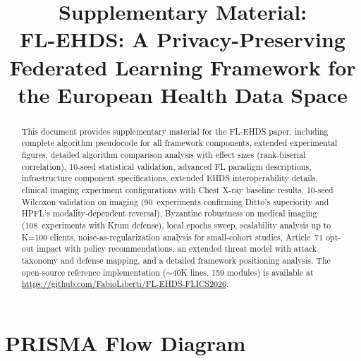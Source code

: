 \documentclass[conference,a4paper]{IEEEtran}
\begin{document}
\renewcommand{\thetable}{S-\Roman{table}}
\renewcommand{\thefigure}{S-\arabic{figure}}

\title{Supplementary Material:\\FL-EHDS: A Privacy-Preserving Federated Learning Framework for the European Health Data Space}

\author{
}

\maketitle

\begin{abstract}
This document provides supplementary material for the FL-EHDS paper, including complete algorithm pseudocode for all framework components, extended experimental figures, detailed algorithm comparison analysis with effect sizes (rank-biserial correlation), 10-seed statistical validation, advanced FL paradigm descriptions, infrastructure component specifications, extended EHDS interoperability details, clinical imaging experiment configurations with Chest X-ray baseline results, 10-seed Wilcoxon validation on imaging (90~experiments confirming Ditto's superiority and HPFL's modality-dependent reversal), Byzantine robustness on medical imaging (108~experiments with Krum defense), local epochs sweep, scalability analysis up to K=100 clients, noise-as-regularization analysis for small-cohort studies, Article~71 opt-out impact with policy recommendations, an extended threat model with attack taxonomy and defense mapping, and a detailed framework positioning analysis. The open-source reference implementation ($\sim$40K lines, 159 modules) is available at \url{https://github.com/FabioLiberti/FL-EHDS-FLICS2026}.
\end{abstract}

\section{PRISMA Flow Diagram}
\label{sec:prisma}
\end{document}
